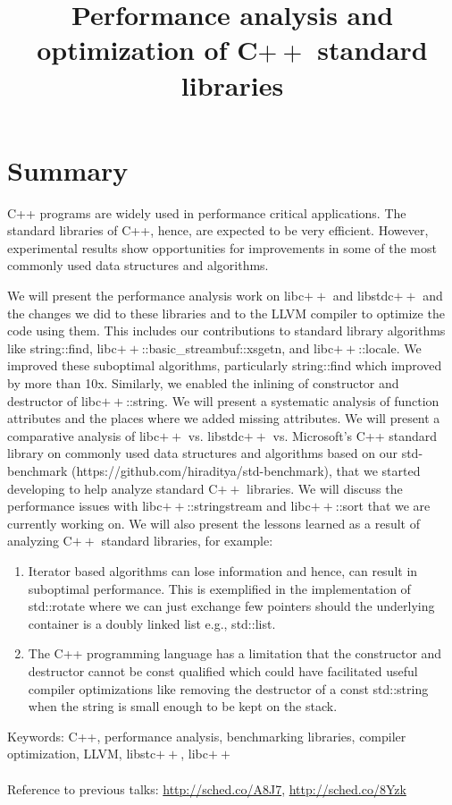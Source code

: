 \documentclass[10pt]{article}
\begin{document}
\title{Performance analysis and optimization of C$++$ standard libraries}
\date{}

\maketitle

\section*{Summary}
C++ programs are widely used in performance critical applications. The standard
libraries of C++, hence, are expected to be very efficient. However,
experimental results show opportunities for improvements in some of the most
commonly used data structures and algorithms.

We will present the performance analysis work on libc$++$ and libstdc$++$ and
the changes we did to these libraries and to the LLVM compiler to optimize the
code using them. This includes our contributions to standard library algorithms
like string::find, libc$++$::basic\_streambuf::xsgetn, and libc$++$::locale. We
improved these suboptimal algorithms, particularly string::find which improved
by more than 10x. Similarly, we enabled the inlining of constructor and
destructor of libc$++$::string. We will present a systematic analysis of
function attributes and the places where we added missing attributes. We will
present a comparative analysis of libc$++$ vs. libstdc$++$ vs. Microsoft's C++
standard library on commonly used data structures and algorithms based on our
std-benchmark (https://github.com/hiraditya/std-benchmark), that we started
developing to help analyze standard C$++$ libraries. We will discuss the
performance issues with libc$++$::stringstream and libc$++$::sort that we are
currently working on. We will also present the lessons learned as a result of
analyzing C$++$ standard libraries, for example:
\begin{enumerate}
\item Iterator based algorithms can lose information and hence, can result in
  suboptimal performance.  This is exemplified in the implementation of
  std::rotate where we can just exchange few pointers should the underlying
  container is a doubly linked list e.g., std::list.
\item The C++ programming language has a limitation that the constructor and
  destructor cannot be const qualified which could have facilitated useful
  compiler optimizations like removing the destructor of a const std::string
  when the string is small enough to be kept on the stack.
\end{enumerate}

Keywords: C++, performance analysis, benchmarking libraries, compiler
optimization, LLVM, libstc$++$, libc$++$
\\
\\
Reference to previous talks: \url{http://sched.co/A8J7}, \url{http://sched.co/8Yzk}
\end{document}
